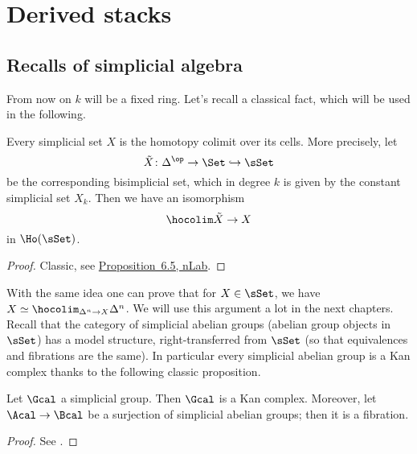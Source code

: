 \chapter{Derived stacks}
    \label{chapter:derived_stacks}
    \section{Recalls of simplicial algebra}
        From now on $k$ will be a fixed ring. 
        Let's recall a classical fact, which will be used in the following.
        \begin{prop}
            \label{prop:simplicial_set_colimit_cells}
            Every simplicial set $X$ is the homotopy colimit over its cells. More precisely, let \[\tilde{X}\colon \Delta^{\op} \to \Set \hookrightarrow \sSet \] be the corresponding bisimplicial set, which in degree $k$ is given by the constant simplicial set $X_k$. Then we have an isomorphism \[\hocolim \tilde{X} \to X \] in $\Ho(\sSet)$.
        \end{prop}
        \begin{proof}
            Classic, see \href{https://ncatlab.org/nlab/show/homotopy+limit#Examples}{Proposition~6.5, nLab}.
        \end{proof}
        With the same idea one can prove that for $X \in \sSet$, we have $X \simeq \hocolim_{\Delta^n \to X} \Delta^n$. We will use this argument a lot in the next chapters.
        Recall that the category of simplicial abelian groups (abelian group objects in $\sSet$) has a model structure, right-transferred from $\sSet$ (so that equivalences and fibrations are the same). In particular every simplicial abelian group is a Kan complex thanks to the following classic proposition.
        \begin{prop}
            \label{prop:simplicial_group_kan_complex}
            Let $\Gcal$ a simplicial group. Then $\Gcal$ is a Kan complex. Moreover, let $\Acal \to \Bcal$ be a surjection of simplicial abelian groups; then it is a fibration.
        \end{prop}
        \begin{proof}
            See \cite[Lemma~I.3.4,Proposition~III.2.10]{GoeJar:simpl_hom}.
        \end{proof}


